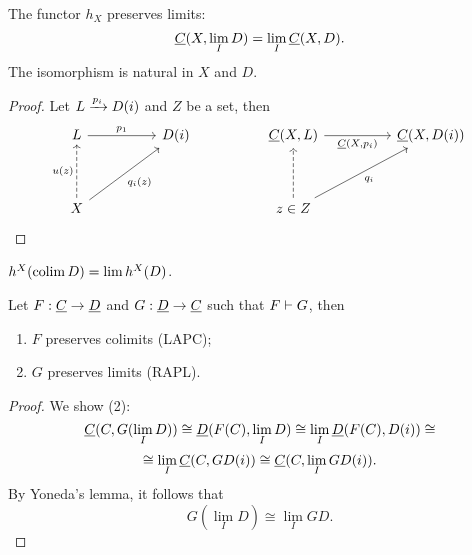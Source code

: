 \begin{theorem*}
	The functor \( h_X \) preserves limits:
	\[
		\underline{C}(X, \lim_I D) = \lim_I \underline{C}(X, D).
	\]
	The isomorphism is natural in \( X \) and \( D \).
\end{theorem*}
\begin{proof}
	Let \( L \xrightarrow{p_i} D(i) \) and \( Z \) be a set, then
	\[
		\begin{tikzcd}
			L && {D(i)} && {\C(X, L)} && {\C(X, D(i))} \\
			\\
			X &&&& {z \in Z}
			\arrow["{p_1}", from=1-1, to=1-3]
			\arrow["{\C(X, p_i)}"', from=1-5, to=1-7]
			\arrow["{u(z)}", dashed, from=3-1, to=1-1]
			\arrow["{q_i(z)}"', from=3-1, to=1-3]
			\arrow[dashed, from=3-5, to=1-5]
			\arrow["{q_i}"', from=3-5, to=1-7]
		\end{tikzcd}
	\]
\end{proof}

\begin{corollary*}
	\( h^X(\operatorname{colim} D) = \lim h^X(D) \).
\end{corollary*}

\begin{corollary*}
	Let \( F: \underline{C} \to \underline{D} \) and \( G: \underline{D} \to \underline{C} \) such that \( F \mathrel{\vdash} G \), then
	\begin{enumerate}
		\item \( F \) preserves colimits (LAPC);
		\item \( G \) preserves limits (RAPL).
	\end{enumerate}
\end{corollary*}
\begin{proof}
	We show (2):
	\[
		\underline{C}(C, G(\lim_I D)) \cong \underline{D}(F(C), \lim_I D) \cong \lim_I \underline{D}(F(C), D(i)) \cong
	\]
	\[
		\cong \lim_I \underline{C}(C, GD(i)) \cong \underline{C}(C, \lim_I GD(i)).
	\]
	By Yoneda's lemma, it follows that
	\[
		G(\lim_I D) \cong \lim_I GD.
	\]
\end{proof}

